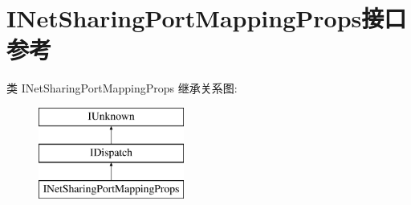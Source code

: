 \hypertarget{interface_i_net_sharing_port_mapping_props}{}\section{I\+Net\+Sharing\+Port\+Mapping\+Props接口 参考}
\label{interface_i_net_sharing_port_mapping_props}
类 I\+Net\+Sharing\+Port\+Mapping\+Props 继承关系图\+:\begin{figure}[H]
\begin{center}
\leavevmode
\includegraphics[height=3.000000cm]{interface_i_net_sharing_port_mapping_props}
\end{center}
\end{figure}
